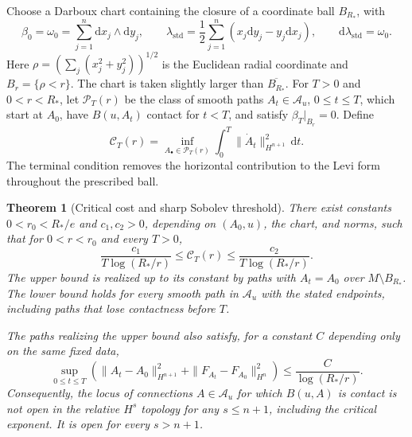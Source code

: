 \documentclass[11pt,a4paper]{article}
\numberwithin{equation}{section}
\newtheorem{theorem}{Theorem}[section]
\theoremstyle{definition}
\theoremstyle{remark}
\newcommand{\dd}{\mathrm d}
\begin{document}
Choose a Darboux chart containing the closure of a coordinate ball $B_{R_*}$, with
\begin{equation}\label{eq:critical-darboux}
 \beta_0=\omega_0=\sum_{j=1}^n\dd x_j\wedge\dd y_j,
 \qquad
 \lambda_{\mathrm{std}}=\frac12\sum_{j=1}^n(x_j\dd y_j-y_j\dd x_j),
 \qquad \dd\lambda_{\mathrm{std}}=\omega_0.
\end{equation}
Here $\rho=(\sum_j(x_j^2+y_j^2))^{1/2}$ is the Euclidean radial coordinate
and $B_r=\{\rho<r\}$. The chart is taken slightly larger than
$\overline{B_{R_*}}$. For $T>0$ and
$0<r<R_*$, let $\mathcal P_T(r)$ be the class of smooth paths
$A_t\in\mathcal A_u$, $0\leq t\leq T$, which start at $A_0$, have
$B(u,A_t)$ contact for $t<T$, and satisfy $\beta_T|_{B_r}=0$. Define
\begin{equation}\label{eq:critical-cost}
 \mathcal C_T(r)=
 \inf_{A_\bullet\in\mathcal P_T(r)}
       \int_0^T\|\dot A_t\|_{H^{n+1}}^2\,\dd t.
\end{equation}
The terminal condition removes the horizontal contribution to the
Levi form throughout the prescribed ball.

\begin{theorem}[Critical cost and sharp Sobolev threshold]\label{thm:critical}
There exist constants $0<r_0<R_*/e$ and $c_1,c_2>0$, depending on $(A_0,u)$, the chart,
and norms, such that for $0<r<r_0$ and every $T>0$,
\begin{equation}\label{eq:critical-two-sided}
 \frac{c_1}{T\log(R_*/r)}\leq\mathcal C_T(r)
       \leq\frac{c_2}{T\log(R_*/r)}.
\end{equation}
The upper bound is realized up to its constant by paths with $A_t=A_0$
over $M\setminus B_{R_*}$.
The lower bound holds for every smooth path in $\mathcal A_u$ with
the stated endpoints, including paths that lose contactness before $T$.

The paths realizing the upper bound also satisfy, for a constant $C$
depending only on the same fixed data,
\begin{equation}\label{eq:critical-uniform}
 \sup_{0\leq t\leq T}
 \left(\|A_t-A_0\|_{H^{n+1}}^2+
       \|F_{A_t}-F_{A_0}\|_{H^n}^2\right)
       \leq\frac{C}{\log(R_*/r)}.
\end{equation}
Consequently, the locus of connections $A\in\mathcal A_u$ for which
$B(u,A)$ is contact is not open in the relative $H^s$ topology for any
$s\leq n+1$, including the critical exponent. It is open for every
$s>n+1$.
\end{theorem}
\end{document}
